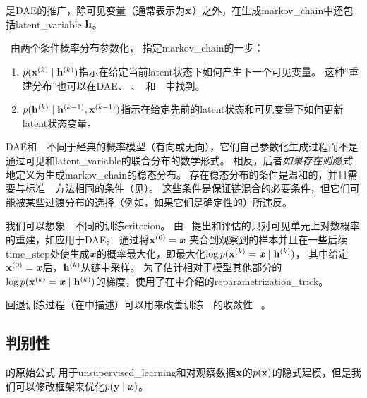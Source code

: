 
\section{}
\label{sec:generative_stochastic_networks}
 \citep{Bengio-et-al-ICML-2014} 是\gls{DAE}的推广，除可见变量（通常表示为$\mathbf{x}$）之外，在生成\gls{markov_chain}中还包括\gls{latent_variable} $\mathbf{h}$。

~由两个条件概率分布参数化， 指定\gls{markov_chain}的一步：
\begin{enumerate}
 \item $p(\mathbf{x}^{(k)}  \mid \mathbf{h}^{(k)} )$指示在给定当前\gls{latent}状态下如何产生下一个可见变量。
 这种``重建分布''也可以在\gls{DAE}、 、~和~~中找到。
 \item $p(\mathbf{h}^{(k)}  \mid \mathbf{h}^{(k-1)}, \mathbf{x}^{(k-1)})$指示在给定先前的\gls{latent}状态和可见变量下如何更新\gls{latent}状态变量。
\end{enumerate}

\gls{DAE}和~~不同于经典的概率模型（有向或无向），它们自己参数化生成过程而不是通过可见和\gls{latent_variable}的联合分布的数学形式。
相反，后者\emph{如果存在则隐式}地定义为生成\gls{markov_chain}的稳态分布。
存在稳态分布的条件是温和的，并且需要与标准~~方法相同的条件（见）。
这些条件是保证链混合的必要条件，但它们可能被某些过渡分布的选择（例如，如果它们是确定性的）所违反。


我们可以想象~~不同的训练\gls{criterion}。
由~\citet{Bengio-et-al-ICML-2014} 提出和评估的只对可见单元上对数概率的重建，如应用于\gls{DAE}。
通过将$\mathbf{x}^{(0)} = \boldsymbol{\mathit{x}}$ 夹合到观察到的样本并且在一些后续\gls{time_step}处使生成$\boldsymbol{\mathit{x}}$的概率最大化，即最大化$\log p(\mathbf{x}^{(k)} = \boldsymbol{\mathit{x}}  \mid  \mathbf{h}^{(k)})$， 其中给定$\mathbf{x}^{(0)} = \boldsymbol{\mathit{x}}$后，$\mathbf{h}^{(k)}$从链中采样。
为了估计相对于模型其他部分的$\log p(\mathbf{x}^{(k)} = \boldsymbol{\mathit{x}}  \mid  \mathbf{h}^{(k)})$的梯度，\citet{Bengio-et-al-ICML-2014}使用了在中介绍的\gls{reparametrization_trick}。

回退训练过程（在中描述）可以用来改善训练~~的收敛性~\citep{Bengio-et-al-ICML-2014} 。


\subsection{判别性\,}
\label{sec:discriminant_gsns}
的原始公式\citep{Bengio-et-al-ICML-2014} 用于\gls{unsupervised_learning}和对观察数据$\mathbf{x}$的$p(\mathbf{x})$的隐式建模，但是我们可以修改框架来优化$p(\mathbf{y}  \mid  \boldsymbol{\mathit{x}})$。


